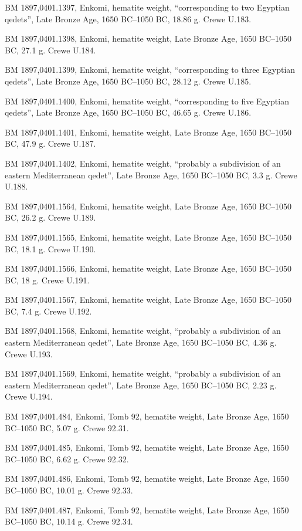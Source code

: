 \documentclass{article}
\begin{document}
BM 1897,0401.1397, Enkomi, hematite weight, ``corresponding to two Egyptian qedets'',
Late Bronze Age, 1650 BC--1050 BC,
18.86 g.
Crewe U.183.

BM 1897,0401.1398, Enkomi, hematite weight,
Late Bronze Age, 1650 BC--1050 BC,
27.1 g.
Crewe U.184.

BM 1897,0401.1399, Enkomi, hematite weight, ``corresponding to three Egyptian qedets'',
Late Bronze Age, 1650 BC--1050 BC,
28.12 g.
Crewe U.185.

BM 1897,0401.1400, Enkomi, hematite weight, ``corresponding to five Egyptian qedets'',
Late Bronze Age, 1650 BC--1050 BC,
46.65 g. 
Crewe U.186.

BM 1897,0401.1401, Enkomi, hematite weight,
Late Bronze Age, 1650 BC--1050 BC,
47.9 g.
Crewe U.187.

BM 1897,0401.1402, Enkomi, hematite weight, ``probably a subdivision of an eastern Mediterranean qedet'',
Late Bronze Age, 1650 BC--1050 BC,
3.3 g.
Crewe U.188.

BM 1897,0401.1564, Enkomi, hematite weight,
Late Bronze Age, 1650 BC--1050 BC,
26.2 g. 
Crewe U.189.

BM 1897,0401.1565, Enkomi, hematite weight,
Late Bronze Age, 1650 BC--1050 BC,
18.1 g.
Crewe U.190.

BM 1897,0401.1566, Enkomi, hematite weight,
Late Bronze Age, 1650 BC--1050 BC,
18 g. 
Crewe U.191.

BM 1897,0401.1567, Enkomi, hematite weight,
Late Bronze Age, 1650 BC--1050 BC,
7.4 g.
Crewe U.192.

BM 1897,0401.1568, Enkomi, hematite weight, ``probably a subdivision of an eastern Mediterranean qedet'',
Late Bronze Age, 1650 BC--1050 BC,
4.36 g.
Crewe U.193.

BM 1897,0401.1569, Enkomi, hematite weight, ``probably a subdivision of an eastern Mediterranean qedet'',
Late Bronze Age, 1650 BC--1050 BC,
2.23 g.
Crewe U.194.

BM 1897,0401.484, Enkomi, Tomb 92, hematite weight,
Late Bronze Age, 1650 BC--1050 BC,
5.07 g.
Crewe 92.31.

BM 1897,0401.485, Enkomi, Tomb 92, hematite weight,
Late Bronze Age, 1650 BC--1050 BC,
6.62 g.
Crewe 92.32.

BM 1897,0401.486, Enkomi, Tomb 92, hematite weight,
Late Bronze Age, 1650 BC--1050 BC,
10.01 g.
Crewe 92.33.

BM 1897,0401.487, Enkomi, Tomb 92, hematite weight,
Late Bronze Age, 1650 BC--1050 BC,
10.14 g.
Crewe 92.34.
\end{document}
